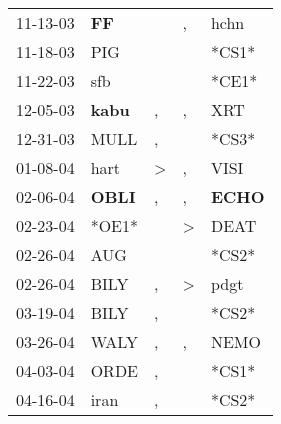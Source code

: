 \begin{supertabular}{p{0.07\textwidth}p{0.06\textwidth}p{0.02\textwidth}p{0.02\textwidth}p{0.06\textwidth}}
          11-13-03\textsuperscript{} &    \textbf{FF\textsuperscript{}} &                  &                , &           hchn\textsuperscript{} \\
          11-18-03\textsuperscript{} &            PIG\textsuperscript{} &                  &                  &                            *CS1* \\
          11-22-03\textsuperscript{} &            sfb\textsuperscript{} &                  &                  &                            *CE1* \\
          12-05-03\textsuperscript{} &  \textbf{kabu\textsuperscript{}} &                , &                , &            XRT\textsuperscript{} \\
          12-31-03\textsuperscript{} &           MULL\textsuperscript{} &                , &                  &                            *CS3* \\
          01-08-04\textsuperscript{} &           hart\textsuperscript{} &     \textgreater &                , &           VISI\textsuperscript{} \\
          02-06-04\textsuperscript{} &  \textbf{OBLI\textsuperscript{}} &                , &                , &  \textbf{ECHO\textsuperscript{}} \\
          02-23-04\textsuperscript{} &                            *OE1* &                  &     \textgreater &           DEAT\textsuperscript{} \\
          02-26-04\textsuperscript{} &            AUG\textsuperscript{} &                  &                  &                            *CS2* \\
          02-26-04\textsuperscript{} &           BILY\textsuperscript{} &                , &     \textgreater &           pdgt\textsuperscript{} \\
          03-19-04\textsuperscript{} &           BILY\textsuperscript{} &                , &                  &                            *CS2* \\
          03-26-04\textsuperscript{} &           WALY\textsuperscript{} &                , &                , &           NEMO\textsuperscript{} \\
          04-03-04\textsuperscript{} &           ORDE\textsuperscript{} &                , &                  &                            *CS1* \\
          04-16-04\textsuperscript{} &           iran\textsuperscript{} &                , &                  &                            *CS2* \\

\end{supertabular}
